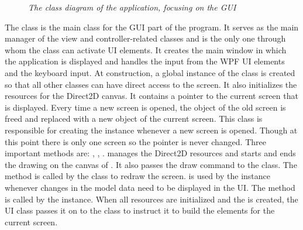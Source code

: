 \begin{figure}[H]
\caption{\emph{The class diagram of the application, focusing on the GUI}}
\label{fig: gui_classdiagram}
\end{figure}

The  class is the main class for the GUI part of the program. It serves as the main manager of the view and controller-related classes and is the only one through whom the  class can activate UI elements. It creates the main window in which the application is displayed and handles the input from the WPF UI elements and the keyboard input. At construction, a global instance of the  class is created so that all other classes can have direct access to the screen. It also initializes the resources for the Direct2D canvas. It contains a pointer to the current screen that is displayed. Every time a new screen is opened, the object of the old screen is freed and replaced with a new object of the current screen. This class is responsible for creating the instance whenever a new screen is opened. Though at this point there is only one screen so the pointer is never changed. Three important methods are:  , , .  manages the Direct2D resources and starts and ends the drawing on the canvas of . It also passes the draw command to the  class. The method is called by the  class to redraw the screen.  is used by the  instance whenever changes in the model data need to be displayed in the UI. The  method is called by the  instance. When all resources are initialized and the  is created, the UI class passes it on to the  class to instruct it to build the elements for the current screen.\\

